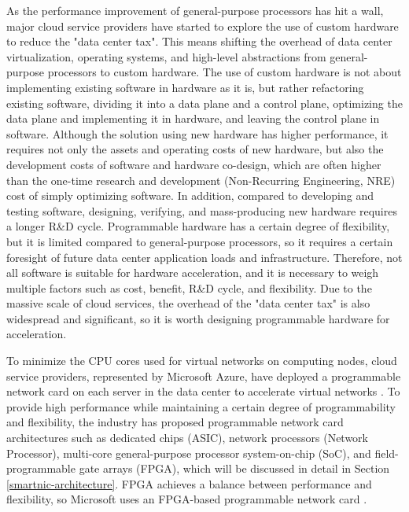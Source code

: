 As the performance improvement of general-purpose processors has hit a wall, major cloud service providers have started to explore the use of custom hardware to reduce the "data center tax". This means shifting the overhead of data center virtualization, operating systems, and high-level abstractions from general-purpose processors to custom hardware. The use of custom hardware is not about implementing existing software in hardware as it is, but rather refactoring existing software, dividing it into a data plane and a control plane, optimizing the data plane and implementing it in hardware, and leaving the control plane in software. Although the solution using new hardware has higher performance, it requires not only the assets and operating costs of new hardware, but also the development costs of software and hardware co-design, which are often higher than the one-time research and development (Non-Recurring Engineering, NRE) cost of simply optimizing software. In addition, compared to developing and testing software, designing, verifying, and mass-producing new hardware requires a longer R&D cycle. Programmable hardware has a certain degree of flexibility, but it is limited compared to general-purpose processors, so it requires a certain foresight of future data center application loads and infrastructure. Therefore, not all software is suitable for hardware acceleration, and it is necessary to weigh multiple factors such as cost, benefit, R&D cycle, and flexibility. Due to the massive scale of cloud services, the overhead of the "data center tax" is also widespread and significant, so it is worth designing programmable hardware for acceleration.

To minimize the CPU cores used for virtual networks on computing nodes, cloud service providers, represented by Microsoft Azure, have deployed a programmable network card on each server in the data center to accelerate virtual networks \cite{smartnic}. To provide high performance while maintaining a certain degree of programmability and flexibility, the industry has proposed programmable network card architectures such as dedicated chips (ASIC), network processors (Network Processor), multi-core general-purpose processor system-on-chip (SoC), and field-programmable gate arrays (FPGA), which will be discussed in detail in Section \ref{smartnic-architecture}. FPGA achieves a balance between performance and flexibility, so Microsoft uses an FPGA-based programmable network card \cite{putnam2014reconfigurable}.


